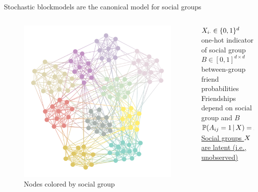 \documentclass[aspectratio=169]{beamer}
\theoremstyle{remark}
\begin{document}
\begin{frame}{Stochastic blockmodels are the canonical model for social groups}
    \begin{columns}
        \begin{column}{0.4\textwidth}
            \begin{figure}
                \centering
                \includegraphics[width=\textwidth]{./figures/assortative.png}
                \footnotesize
                \caption*{Nodes colored by social group}
            \end{figure}
        \end{column}
        \begin{column}{0.6\textwidth}
            $X_{i \cdot} \in \{0, 1\}^d$ one-hot indicator of social group \\
            \vspace{4mm}
            $B \in [0, 1]^{d \times d}$ between-group friend probabilities \\
            \vspace{4mm}
            Friendships depend on social group and $B$ \\
            \vspace{4mm}
            $\P[\X]{A_{ij} = 1} = \X_{i \cdot} B \X_{j \cdot}^T$ \\
            \vspace{4mm}
            \underline{Social groups $X$ are latent (i.e., unobserved)} \\
        \end{column}
    \end{columns}
\end{frame}
\end{document}
